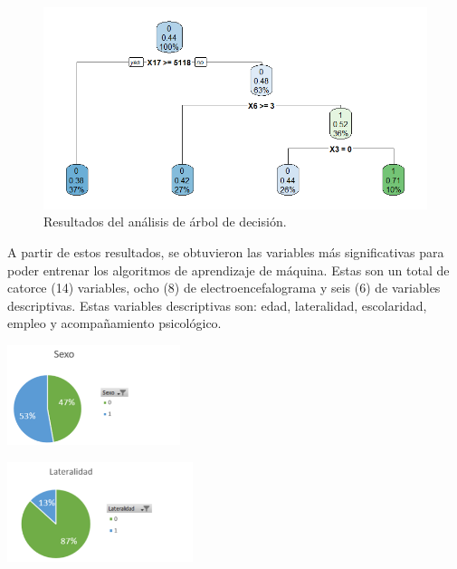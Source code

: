 \begin{figure}
    \centering
    \includegraphics[scale=0.75]{figuras/Rplot2.png}
    \caption{Resultados del análisis de árbol de decisión.}
    \label{fig:my_label}
\end{figure}

A partir de estos resultados, se obtuvieron las variables más significativas para poder entrenar los algoritmos de aprendizaje de máquina. Estas son un total de catorce (14) variables, ocho (8) de electroencefalograma y seis (6) de variables descriptivas. Estas variables descriptivas son: edad, lateralidad, escolaridad, empleo y acompañamiento psicológico. 









\begin{center}
\includegraphics[height=1.15in]{figuras/Imagen11.png}
\end{center}

\begin{center}
\includegraphics[height=1.15in]{figuras/Imagen12.png}
\end{center}

